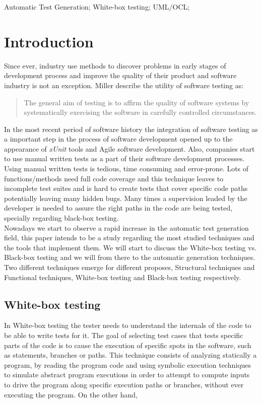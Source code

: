 \documentclass[10pt, conference, compsocconf]{IEEEtran}
\newcommand{\xunit}{\textit{xUnit}}
\begin{document}
\begin{IEEEkeywords}
Automatic Test Generation; White-box testing; UML/OCL;
\end{IEEEkeywords}

\IEEEpeerreviewmaketitle

\section{Introduction}
Since ever, industry use methods to discover problems in early stages of development process and improve
the quality of their product and software industry is not an exception. Miller\cite{miller} describe the utility
of software testing as:

\begin{quotation}
The general aim of testing is to affirm the quality of software systems by systematically
exercising the software in carefully controlled circumstances.
\end{quotation}

In the most recent period of software history the integration of software testing as a important step in the process of
software development opened up to the appearance of \xunit\cite{xunit} tools and Agile software development.
Also, companies start to use manual written tests as a part of their software development processes.\\
Using  manual written tests is tedious, time consuming and error-prone. Lots of functions/methods need full code coverage and this technique leaves
to incomplete test suites and is hard to create tests that cover specific code paths potentially leaving many hidden bugs. Many times a supervision leaded by the developer
is needed to assure the right paths in the code are being tested, specially regarding black-box testing.\\
\indent Nowadays we start to observe a rapid increase in the automatic test generation field, this paper intends to be a study regarding the most studied techniques
and the tools that implement them. We will start to discuss the White-box testing vs. Black-box testing and we will from there to the automatic generation techniques.\\

Two different techniques emerge for different proposes, Structural techniques and Functional techniques,
White-box testing and Black-box\cite{black} testing respectively.

\subsection{White-box testing}
In White-box testing the tester needs to understand the internals of the code to be able to write tests for it.
The goal of selecting test cases that tests specific parts of the code is to cause the execution of specific spots in the software, such as statements, branches or
paths. This technique consists of analyzing statically a program, by reading the program code and using symbolic execution techniques to simulate abstract program
executions in order to attempt to compute inputs to drive the program along specific execution paths or branches, without ever executing the program.
On the other hand,
\end{document}
